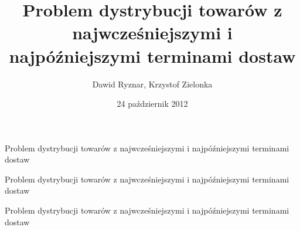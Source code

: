 \documentclass{beamer}
\title{Problem  dystrybucji towarów z najwcześniejszymi i najpóźniejszymi terminami dostaw}
\author{Dawid Ryznar, Krzystof Zielonka}
\date{24 październik 2012}
\begin{document}
\frame{\titlepage}

\begin{frame}{Problem  dystrybucji towarów z najwcześniejszymi i najpóźniejszymi terminami dostaw}
	
\end{frame}

\begin{frame}{Problem  dystrybucji towarów z najwcześniejszymi i najpóźniejszymi terminami dostaw}
	
\end{frame}

\begin{frame}{Problem  dystrybucji towarów z najwcześniejszymi i najpóźniejszymi terminami dostaw}
	 
\end{frame}
\end{document}
